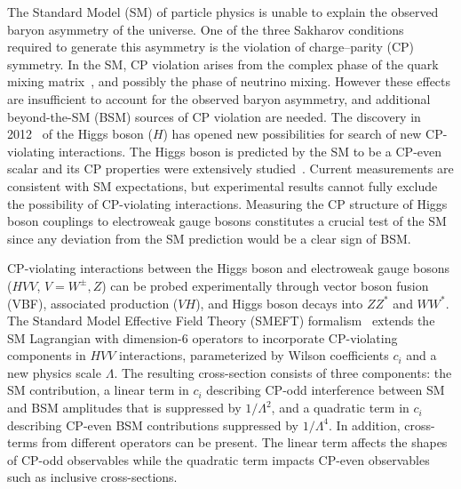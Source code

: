 \documentclass[PAPER, atlasdraft=false, cernpreprint,UKenglish, texmf, orcidlogo]{atlasdoc}
\author{The ATLAS Collaboration}
\begin{document}
\maketitle









The Standard Model (SM) of particle physics is unable to explain the observed baryon asymmetry of the universe. One of the three Sakharov conditions~\cite{Sakharov:1967dj} required to generate this asymmetry is the violation of charge--parity (CP) symmetry. In the SM, CP violation arises from the complex phase of the quark mixing matrix~\cite{Kobayashi:1973fv,Cabibbo:1963yz}, and possibly the phase of neutrino mixing. However these effects are insufficient to account for the observed baryon asymmetry, and additional beyond-the-SM (BSM) sources of CP violation are needed.
The discovery in 2012~\cite{HIGG-2012-27,CMS-HIG-12-028} of the Higgs boson ($H$) has opened new possibilities for search of new CP-violating interactions. The Higgs boson is predicted by the SM to be a CP-even scalar and its CP properties were extensively studied~\cite{HIGP-2024-09, HIGP-2024-07, HIGG-2020-08, HIGG-2019-13,HIGG-2019-01, HIGG-2018-30, HIGG-2018-14,HIGG-2017-13,CMS-HIG-20-006,CMS-HIG-20-007,CMS-HIG-19-013,CMS-HIG-19-009,CMS-HIG-17-034,CMS-HIG-22-008,Bahl:2022yrs}. Current measurements are consistent with SM expectations,  but experimental results cannot fully exclude the possibility of CP-violating interactions. Measuring the CP structure of Higgs boson couplings to electroweak gauge bosons constitutes a crucial test of the SM since any deviation from the SM prediction would be a clear sign of BSM.




CP-violating interactions between the Higgs boson and electroweak gauge bosons ($HVV$, $V=W^\pm,Z$) can be probed experimentally through vector boson fusion (VBF), associated production ($VH$), and Higgs boson decays into $ZZ^*$ and $WW^*$.
The Standard Model Effective Field Theory (SMEFT) formalism~\cite{SMEFTsim, Buchmuller:1985jz, Brivio:2017vri, Warsaw} extends the SM Lagrangian with dimension-6 operators to incorporate CP-violating components in $HVV$ interactions, parameterized by Wilson coefficients $c_i$ and a new physics scale $\Lambda$.
The resulting cross-section consists of three components: the SM contribution, a linear term in $c_i$ describing CP-odd interference between SM and BSM amplitudes that is suppressed by $1/\Lambda^2$, and a quadratic term in $c_i$ describing CP-even BSM contributions suppressed by $1/\Lambda^4$.
In addition, cross-terms from different operators can be present.
The linear term affects the shapes of CP-odd observables while the quadratic term impacts CP-even observables such as inclusive cross-sections.
\end{document}

